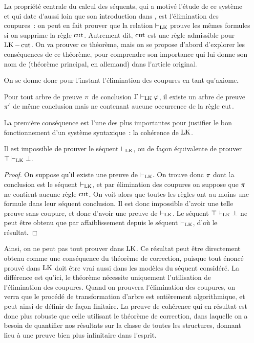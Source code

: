 La propriété centrale du calcul des séquents, qui a motivé l'étude de ce système
et qui date d'aussi loin que son introduction dans \cite{Gentzen1934I}, est
l'élimination des coupures~: on peut en fait prouver que la relation $\vdash_{\operatorname{LK}}$
prouve les mêmes formules si on supprime la règle $\operatorname{cut}$. Autrement dit,
$\operatorname{cut}$ est une règle admissible pour $\operatorname{LK} - \operatorname{cut}$. On va prouver ce théorème,
mais on se propose d'abord d'explorer les conséquences de ce théorème, pour
comprendre son importance qui lui donne son nom de 
(théorème principal, en allemand) dans l'article original.

On se donne donc pour l'instant l'élimination des coupures en tant qu'axiome.

\begin{axiom}\label{ax.cut.elim}
  Pour tout arbre de preuve $\pi$ de conclusion $\Gamma\vdash_{\operatorname{LK}} \varphi$, il
  existe un arbre de preuve $\pi'$ de même conclusion mais ne contenant
  aucune occurrence de la règle $\operatorname{cut}$.
\end{axiom}

La première conséquence est l'une des plus importantes pour justifier le bon
fonctionnement d'un système syntaxique~: la cohérence de $\LK$.

\begin{theorem}[Cohérence de $\LK$]
  Il est impossible de prouver le séquent $\vdash_{\operatorname{LK}}$, ou de façon équivalente de
  prouver $\top\vdash_{\operatorname{LK}}\bot$.
\end{theorem}

\begin{proof}
  On suppose qu'il existe une preuve de $\vdash_{\operatorname{LK}}$. On trouve donc $\pi$ dont
  la conclusion est le séquent $\vdash_{\operatorname{LK}}$, et par élimination des coupures on
  suppose que $\pi$ ne contient aucune règle $\operatorname{cut}$. On voit alors que
  toutes les règles ont au moins une formule dans leur séquent conclusion. Il
  est donc impossible d'avoir une telle preuve sans coupure, et donc d'avoir
  une preuve de $\vdash_{\operatorname{LK}}$. Le séquent $\top\vdash_{\operatorname{LK}}\bot$ ne peut être obtenu que par
  affaiblissement depuis le séquent $\vdash_{\operatorname{LK}}$, d'où le résultat.
\end{proof}

Ainsi, on ne peut pas tout prouver dans $\LK$. Ce résultat peut être directement
obtenu comme une conséquence du théorème de correction, puisque tout énoncé
prouvé dans $\LK$ doit être vrai aussi dans les modèles du séquent considéré.
La différence est qu'ici, le théorème nécessite uniquement l'utilisation de
l'élimination des coupures. Quand on prouvera l'élimination des coupures, on
verra que le procédé de transformation d'arbre est entièrement algorithmique,
et peut ainsi de définir de façon finitaire. La preuve de cohérence qui en
résultat est donc plus robuste que celle utilisant le théorème de correction,
dans laquelle on a besoin de quantifier nos résultats sur la classe de toutes
les structures, donnant lieu à une preuve bien plus infinitaire dans l'esprit.

